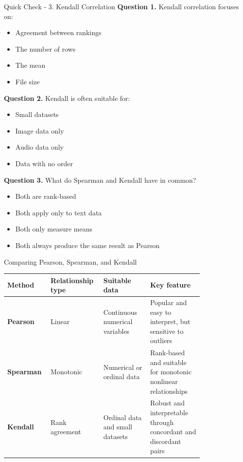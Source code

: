 \documentclass[aspectratio=169,11pt]{beamer}
\begin{document}
\begin{frame}[allowframebreaks]{Quick Check - 3. Kendall Correlation}
\footnotesize
\textbf{Question 1.} Kendall correlation focuses on:\par\medskip
\begin{itemize}
\item[\textbf{A.}] Agreement between rankings
\item[\textbf{B.}] The number of rows
\item[\textbf{C.}] The mean
\item[\textbf{D.}] File size
\end{itemize}
\textbf{Question 2.} Kendall is often suitable for:\par\medskip
\begin{itemize}
\item[\textbf{A.}] Small datasets
\item[\textbf{B.}] Image data only
\item[\textbf{C.}] Audio data only
\item[\textbf{D.}] Data with no order
\end{itemize}
\textbf{Question 3.} What do Spearman and Kendall have in common?\par\medskip
\begin{itemize}
\item[\textbf{A.}] Both are rank-based
\item[\textbf{B.}] Both apply only to text data
\item[\textbf{C.}] Both only measure means
\item[\textbf{D.}] Both always produce the same result as Pearson
\end{itemize}
\end{frame}
\begin{frame}[allowframebreaks]{Comparing Pearson, Spearman, and Kendall}
\small
\begin{center}\scriptsize
\begin{tabular}{@{}p{0.14\linewidth}p{0.19\linewidth}p{0.22\linewidth}p{0.25\linewidth}@{}}
\toprule
\textbf{Method} & \textbf{Relationship type} & \textbf{Suitable data} & \textbf{Key feature}\\
\midrule
\textbf{Pearson} & Linear & Continuous numerical variables & Popular and easy to interpret, but sensitive to outliers\\
\textbf{Spearman} & Monotonic & Numerical or ordinal data & Rank-based and suitable for monotonic nonlinear relationships\\
\textbf{Kendall} & Rank agreement & Ordinal data and small datasets & Robust and interpretable through concordant and discordant pairs\\
\bottomrule
\end{tabular}
\end{center}
\end{frame}
\end{document}
